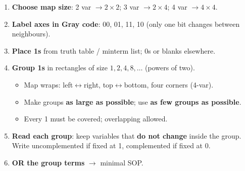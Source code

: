 \documentclass[11pt]{article}
\begin{document}
\begin{methode}
\begin{enumerate}
\item \textbf{Choose map size}: 2 var $\to 2\times2$; 3 var $\to 2\times4$; 4 var $\to 4\times4$.
\item \textbf{Label axes in Gray code}: 00, 01, 11, 10 (only one bit changes between neighbours).
\item \textbf{Place 1s} from truth table / minterm list; 0s or blanks elsewhere.
\item \textbf{Group 1s} in rectangles of size $1,2,4,8,\dots$ (powers of two).
      \begin{itemize}
      \item Map wraps: left$\leftrightarrow$right, top$\leftrightarrow$bottom, four corners (4-var).
      \item Make groups \textbf{as large as possible}; use \textbf{as few groups as possible}.
      \item Every 1 must be covered; overlapping allowed.
      \end{itemize}
\item \textbf{Read each group}: keep variables that \textbf{do not change} inside the group.
      Write uncomplemented if fixed at 1, complemented if fixed at 0.
\item \textbf{OR the group terms} $\to$ minimal SOP.
\end{enumerate}
\end{methode}
\end{document}
